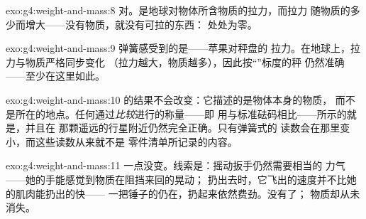 \begin{solution}{exo:g4:weight-and-mass:8}
对。是地球对物体所含物质的拉力，而拉力
随物质的多少而增大——没有物质，就没有可拉的东西：
处处为零。
\end{solution}

\begin{solution}{exo:g4:weight-and-mass:9}
弹簧感受到的是\emph{}——苹果对秤盘的
拉力。在地球上，拉力与物质严格同步变化
（拉力越大，物质越多），因此按“”标度的秤
仍然准确——至少在这里如此。
\end{solution}

\begin{solution}{exo:g4:weight-and-mass:10}
的结果不会改变：它描述的是物体本身的物质，
而不是所在的地点。任何通过\emph{比较}进行的称量——即
用与标准砝码相比——所示的就是，并且在
那颗遥远的行星附近仍然完全正确。只有弹簧式的
读数会在那里变小，而这些读数从来就不是
零件清单所记录的内容。
\end{solution}

\begin{solution}{exo:g4:weight-and-mass:11}
一点没变。线索是：摇动扳手仍然需要相当的
力气——她的手能感觉到物质在阻挡来回的晃动；
扔出去时，它飞出的速度并不比她的肌肉能扔出的快——
一把锤子的仍在，扔起来依然费劲。没有了；
物质却从未消失。
\end{solution}
